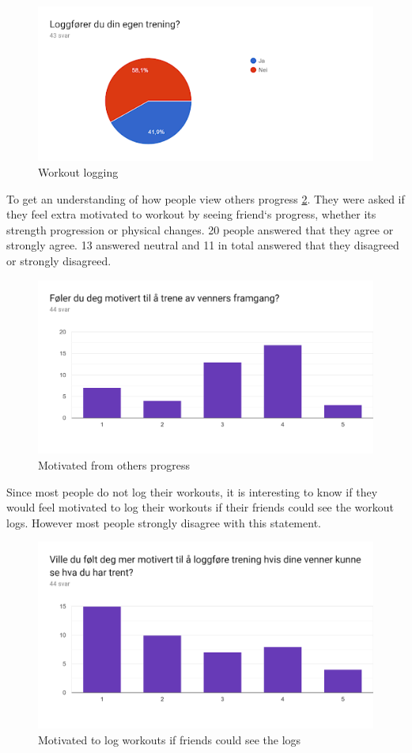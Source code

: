 \begin{figure}[H]
    \centering
    \includegraphics[width=120mm]{figures/loggforerduegentrening.png}
    \caption{Workout logging}
    \label{workoutlogging}
\end{figure}
To get an understanding of how people view others progress \ref{others}. They were asked if they feel extra motivated to workout by seeing friend`s progress, whether its strength progression or physical changes. 20 people answered that they agree or strongly agree. 13 answered neutral and 11 in total answered that they disagreed or strongly disagreed.
\begin{figure}[H]
    \centering
    \includegraphics[width=120mm]{figures/MotivertAvAndresTrening.png}
    \caption{Motivated from others progress}
    \label{others}
\end{figure}
Since most people do not log their workouts, it is interesting to know if they would feel motivated to log their workouts if their friends could see the workout logs. However most people strongly disagree with this statement. 

\begin{figure}[H]
    \centering
    \includegraphics[width=120mm]{figures/MotivertTilLogging.png}
    \caption{Motivated to log workouts if friends could see the logs}
    \label{moti}
\end{figure}

